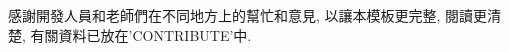 \StartAcknowledgments

感謝開發人員和老師們在不同地方上的幫忙和意見, 以讓本模板更完整, 閱讀更清楚, 有關資料已放在'CONTRIBUTE'中.


\EndAcknowledgments
